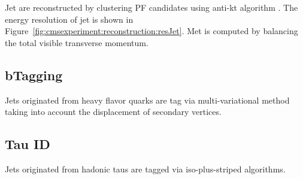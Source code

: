 Jet are reconstructed by clustering PF candidates using anti-kt algorithm \cite{tech:antikt:Cacciari:2008gp}. The energy resolution of jet is shown in Figure~\ref{fig:cmsexperiment:reconstruction:resJet}. Met is computed by balancing the total visible transverse momentum. 



\subsection{bTagging}
Jets originated from heavy flavor quarks are tag via multi-variational method taking into account the displacement of secondary vertices.

\subsection{Tau ID}
 Jets originated from hadonic taus are tagged via iso-plus-striped algorithms.

